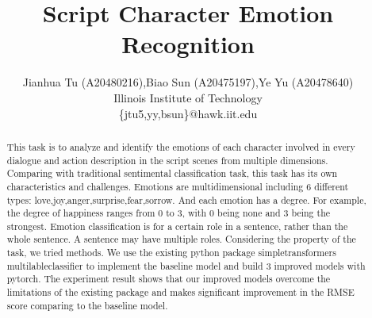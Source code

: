 \documentclass[12pt,twocolumn,letterpaper]{article}
\begin{document}
\title{Script Character Emotion Recognition}

\author{Jianhua Tu (A20480216),Biao Sun (A20475197),Ye Yu (A20478640)\\
Illinois Institute of Technology\\ 
\{jtu5,yy,bsun\}@hawk.iit.edu
}

\maketitle

\begin{abstract}
This task is to analyze and identify the emotions of each character involved in every dialogue and action description in the script scenes from multiple dimensions. Comparing with traditional sentimental classification task, this task has its own characteristics and challenges. Emotions are multidimensional including 6 different types: love,joy,anger,surprise,fear,sorrow. And each emotion has a degree. For example, the degree of happiness ranges from 0 to 3, with 0 being none and 3 being the strongest.  Emotion classification is for a certain role in a sentence, rather than the whole sentence. A sentence may have multiple roles.  Considering the property of the task, we tried methods. We use the existing python package simpletransformers multilableclassifier to implement the baseline model and build 3 improved models with pytorch. The experiment result shows that our improved models overcome the limitations of the existing package and makes significant improvement in the RMSE score comparing to the baseline model.
\end{abstract}

\end{document}
